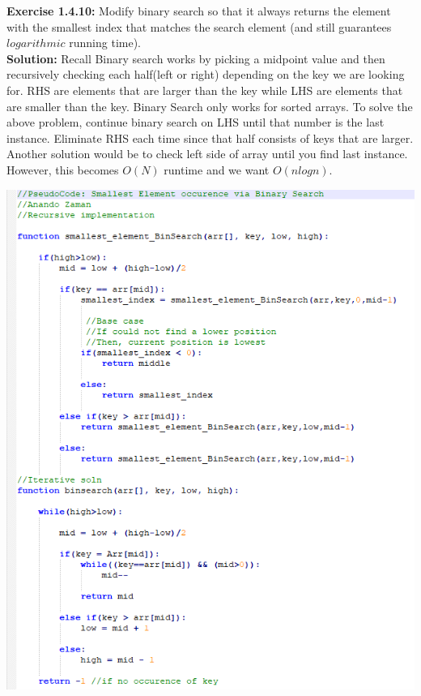 \documentclass[11pt,fleqn]{article}
\begin{document}
\textbf{Exercise 1.4.10:} Modify binary search so that it always returns the element with the smallest
index that matches the search element (and still guarantees $logarithmic$ running time).\\

\textbf{Solution:} Recall Binary search works by picking a midpoint value and then recursively checking each half(left or right) depending on the key we are looking for. RHS are elements that are larger than the key while LHS are elements that are smaller than the key. Binary Search only works for sorted arrays. To solve the above problem, continue binary search on LHS until that number is the last instance. Eliminate RHS each time since that half consists of keys that are larger.\\

Another solution would be to check left side of array until you find last instance. However, this becomes $O(N)$ runtime and we want $O(nlogn)$.

\begin{center}
	\includegraphics[scale = 1]{1.4.10.png}
	\end{center}
\end{document}
